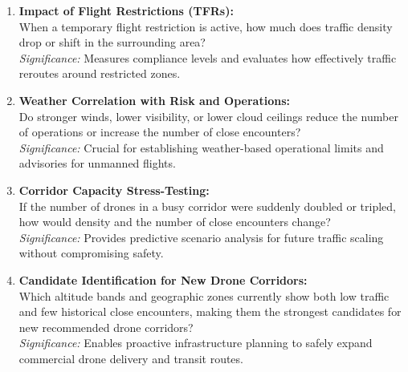 \documentclass[11pt,a4paper]{article}
\begin{document}
\begin{enumerate}
    \item \textbf{Impact of Flight Restrictions (TFRs):} \\
    When a temporary flight restriction is active, how much does traffic density drop or shift in the surrounding area? \\
    \textit{Significance:} Measures compliance levels and evaluates how effectively traffic reroutes around restricted zones.

    \item \textbf{Weather Correlation with Risk and Operations:} \\
    Do stronger winds, lower visibility, or lower cloud ceilings reduce the number of operations or increase the number of close encounters? \\
    \textit{Significance:} Crucial for establishing weather-based operational limits and advisories for unmanned flights.

    \item \textbf{Corridor Capacity Stress-Testing:} \\
    If the number of drones in a busy corridor were suddenly doubled or tripled, how would density and the number of close encounters change? \\
    \textit{Significance:} Provides predictive scenario analysis for future traffic scaling without compromising safety.

    \item \textbf{Candidate Identification for New Drone Corridors:} \\
    Which altitude bands and geographic zones currently show both low traffic and few historical close encounters, making them the strongest candidates for new recommended drone corridors? \\
    \textit{Significance:} Enables proactive infrastructure planning to safely expand commercial drone delivery and transit routes.
\end{enumerate}
\end{document}
